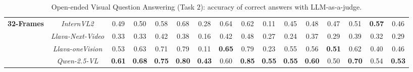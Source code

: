 \begin{table*}[]
{\begin{tabular}{lc|c|cc|c|c|c|c|c|cc|cc|cc}
\multirow{4}{*}{\textbf{32-Frames}} & \textit{InternVL2} & 0.49 & 0.50 &  0.58 &  0.68   &  0.28 &  0.64 &  0.62&  0.11 &  0.45  &  0.48&  0.47 &  0.51 &  \textbf{0.57} &  0.46 \\
 &  \textit{Llava-Next-Video} &  0.33 &  0.33 &  0.42 &  0.38   &  0.16 &  0.42 &  0.48&  0.27 &  0.24 &  0.37 &  0.29 &  0.39 &  0.32 &  0.29 \\
 &  \textit{Llava-oneVision} &  0.53 &  0.63 &  0.71 &  0.79  &  0.11 &  \textbf{0.65} &  0.79&  0.23 &  0.55 &  0.56 &  \textbf{0.51} &  0.62 &  0.40 &  0.46 \\
 &  \textit{Qwen-2.5-VL} &  \textbf{0.61} &  \textbf{0.68} &  \textbf{0.75} &  \textbf{0.80}   &  \textbf{0.43} &  0.60 &  \textbf{0.85}&  \textbf{0.55}&  \textbf{0.55} &  \textbf{0.60} &  0.50 &  \textbf{0.70} &  0.54 &  \textbf{0.53} \\ 
 \bottomrule
\end{tabular}%
}
 \caption{\label{tab:Task2_llm_as_judge_app}
    Open-ended Visual Question Answering (Task $2$): accuracy of correct answers with LLM-as-a-judge.
  }
\end{table*}

